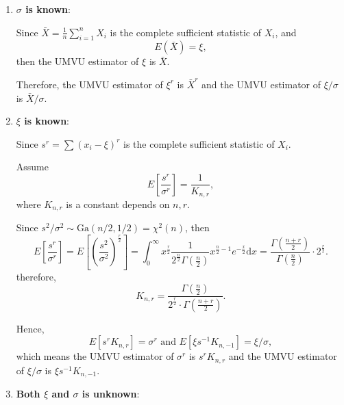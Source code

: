 \begin{solution}
    \begin{enumerate}
        \item \textbf{$\sigma$ is known}:

        Since $\bar{X}=\frac{1}{n}\sum_{i=1}^{n}X_i$ is the complete sufficient statistic of $X_i$, and
        \begin{equation*}
            E(\bar{X})=\xi,
        \end{equation*}
        then the UMVU estimator of $\xi$ is $\bar{X}$.

        Therefore, the UMVU estimator of $\xi^r$ is $\bar{X}^r$ and the UMVU estimator of $\xi/\sigma$ is $\bar{X}/\sigma$.

        \item \textbf{$\xi$ is known}:

        Since $s^r=\sum\left(x_{i}-\xi\right)^r$ is the complete sufficient statistic of $X_i$.

        Assume
        \begin{equation*}
            E\left[\frac{s^r}{\sigma^r}\right]=\frac{1}{K_{n,r}},
        \end{equation*}
        where $K_{n,r}$ is a constant depends on $n,r$.

        Since $s^2/\sigma^2\sim\text{Ga}(n/2,1/2)=\chi^2(n)$, then
        \begin{equation*}
            E\left[\frac{s^r}{\sigma^r}\right]=E\left[\left(\frac{s^2}{\sigma^2}\right)^{\frac{r}{2}}\right]=\int_{0}^{\infty}x^{\frac{r}{2}}\frac{1}{2^{\frac{n}{2}}\Gamma(\frac{n}{2})}x^{\frac{n}{2}-1}e^{-\frac{x}{2}}\mathrm{d}x=\frac{\Gamma\left(\frac{n+r}{2}\right)}{\Gamma(\frac{n}{2})}\cdot 2^{\frac{r}{2}}.
        \end{equation*}
        therefore,
        \begin{equation*}
            K_{n,r}=\frac{\Gamma(\frac{n}{2})}{2^{\frac{r}{2}}\cdot\Gamma\left(\frac{n+r}{2}\right)}.
        \end{equation*}

        Hence,
        \begin{equation*}
            E\left[s^rK_{n,r}\right]=\sigma^r \text{ and } E[\xi s^{-1}K_{n,-1}]=\xi/\sigma,
        \end{equation*}
        which means the UMVU estimator of $\sigma^r$ is $s^rK_{n,r}$ and the UMVU estimator of $\xi/\sigma$ is $\xi s^{-1}K_{n,-1}$.

        \item \textbf{Both $\xi$ and $\sigma$ is unknown}:


\end{enumerate}
\end{solution}
